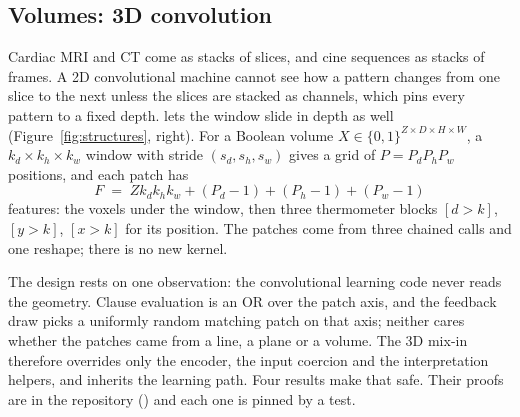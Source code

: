 \subsection{Volumes: 3D convolution}
\label{sec:conv3d}

Cardiac MRI and CT come as stacks of slices, and cine sequences as stacks of frames. A 2D
convolutional machine cannot see how a pattern changes from one slice to the next unless the
slices are stacked as channels, which pins every pattern to a fixed depth.
 lets the window slide in depth as well
(Figure~\ref{fig:structures}, right). For a Boolean volume
$X\in\{0,1\}^{Z\times D\times H\times W}$, a $k_d\times k_h\times k_w$ window with stride
$(s_d,s_h,s_w)$ gives a grid of $P = P_dP_hP_w$ positions, and each patch has
\[
  F \;=\; Z k_d k_h k_w + (P_d-1) + (P_h-1) + (P_w-1)
\]
features: the voxels under the window, then three thermometer blocks $[d>k]$, $[y>k]$,
$[x>k]$ for its position. The patches come from three chained  calls and
one reshape; there is no new kernel.

The design rests on one observation: the convolutional learning code never reads the
geometry. Clause evaluation is an OR over the patch axis, and the feedback draw picks a
uniformly random matching patch on that axis; neither cares whether the patches came from a
line, a plane or a volume. The 3D mix-in therefore overrides only the encoder, the input
coercion and the interpretation helpers, and inherits the learning path. Four results make
that safe. Their proofs are in the repository () and each one is pinned
by a test.

